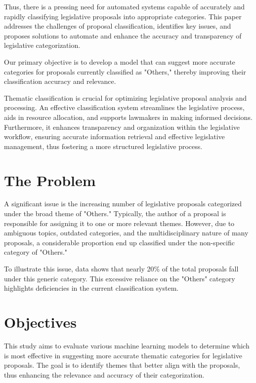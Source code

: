 \documentclass[12pt]{article}
\begin{document}
Thus, there is a pressing need for automated systems capable of accurately and rapidly classifying legislative proposals into appropriate categories. This paper addresses the challenges of proposal classification, identifies key issues, and proposes solutions to automate and enhance the accuracy and transparency of legislative categorization.

Our primary objective is to develop a model that can suggest more accurate categories for proposals currently classified as "Others," thereby improving their classification accuracy and relevance.

Thematic classification is crucial for optimizing legislative proposal analysis and processing. An effective classification system streamlines the legislative process, aids in resource allocation, and supports lawmakers in making informed decisions. Furthermore, it enhances transparency and organization within the legislative workflow, ensuring accurate information retrieval and effective legislative management, thus fostering a more structured legislative process.
	
\section{The Problem}

A significant issue is the increasing number of legislative proposals categorized under the broad theme of "Others." Typically, the author of a proposal is responsible for assigning it to one or more relevant themes. However, due to ambiguous topics, outdated categories, and the multidisciplinary nature of many proposals, a considerable proportion end up classified under the non-specific category of "Others."

To illustrate this issue, data shows that nearly 20\% of the total proposals fall under this generic category. This excessive reliance on the "Others" category highlights deficiencies in the current classification system.

\section{Objectives}

This study aims to evaluate various machine learning models to determine which is most effective in suggesting more accurate thematic categories for legislative proposals. The goal is to identify themes that better align with the proposals, thus enhancing the relevance and accuracy of their categorization.
\end{document}
